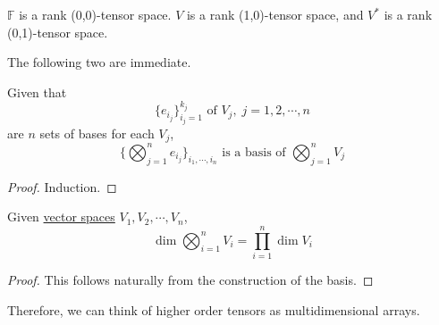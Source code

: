 	\begin{example}
	  \label{ex:low-rank-tensor-product-spaces}
    $\mathbb{F}$ is a rank (0,0)-tensor space. $V$ is a rank (1,0)-tensor space, and $V^{*}$ is a rank (0,1)-tensor space. 
  \end{example}

	The following two are immediate. 

	\begin{theorem}
	  \label{thm:basis-of-n-way-tensor-product-space}
    Given that 
		\begin{equation}
			\{ e_{i_{j}}\}_{i_{j}=1}^{k_{j}} \text{ of } V_{j},\; j = 1, 2, \cdots, n
		\end{equation}
    are $n$ sets of bases for each $V_{j}$, 
		\begin{equation}
    	\{ \bigotimes_{j=1}^{n} e_{i_{j}} \}_{i_{1}, \cdots, i_{n}} \text{ is a basis of } \bigotimes_{j=1}^{n} V_{j}
		\end{equation}
  \end{theorem}
	\begin{proof}
	  Induction. 
	\end{proof}

	\begin{corollary}
	  \label{thm:dimension-of-n-way-tensor-product-space}
    Given \hyperref[def:vector-space]{vector spaces} $V_1, V_2, \cdots, V_n$, 
		\begin{equation}
    	\dim \bigotimes_{i=1}^{n} V_i = \prod_{i=1}^{n} \dim V_{i}
		\end{equation}
  \end{corollary}
  \begin{proof}
    This follows naturally from the construction of the basis.
  \end{proof}

	Therefore, we can think of higher order tensors as multidimensional arrays. 


